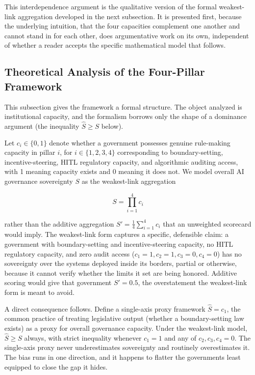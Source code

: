 \documentclass{ieeeaccess}
\begin{document}
This interdependence argument is the qualitative version of the formal weakest-link aggregation developed in the next subsection. It is presented first, because the underlying intuition, that the four capacities complement one another and cannot stand in for each other, does argumentative work on its own, independent of whether a reader accepts the specific mathematical model that follows.

\subsection{Theoretical Analysis of the Four-Pillar Framework}

This subsection gives the framework a formal structure. The object analyzed is institutional capacity, and the formalism borrows only the shape of a dominance argument (the inequality $\hat{S} \ge S$ below).

Let $c_i \in \{0,1\}$ denote whether a government possesses genuine rule-making capacity in pillar $i$, for $i \in \{1,2,3,4\}$ corresponding to boundary-setting, incentive-steering, HITL regulatory capacity, and algorithmic auditing access, with 1 meaning capacity exists and 0 meaning it does not. We model overall AI governance sovereignty $S$ as the weakest-link aggregation

\begin{equation}
S = \prod_{i=1}^{4} c_i
\label{eq:sovereignty}
\end{equation}

\noindent rather than the additive aggregation $S' = \tfrac{1}{4}\sum_{i=1}^{4} c_i$ that an unweighted scorecard would imply. The weakest-link form captures a specific, defensible claim: a government with boundary-setting and incentive-steering capacity, no HITL regulatory capacity, and zero audit access ($c_1=1, c_2=1, c_3=0, c_4=0$) has no sovereignty over the systems deployed inside its borders, partial or otherwise, because it cannot verify whether the limits it set are being honored. Additive scoring would give that government $S' = 0.5$, the overstatement the weakest-link form is meant to avoid.

A direct consequence follows. Define a single-axis proxy framework $\hat{S} = c_1$, the common practice of treating legislative output (whether a boundary-setting law exists) as a proxy for overall governance capacity. Under the weakest-link model, $\hat{S} \ge S$ always, with strict inequality whenever $c_1 = 1$ and any of $c_2, c_3, c_4 = 0$. The single-axis proxy never underestimates sovereignty and routinely overestimates it. The bias runs in one direction, and it happens to flatter the governments least equipped to close the gap it hides.
\end{document}
